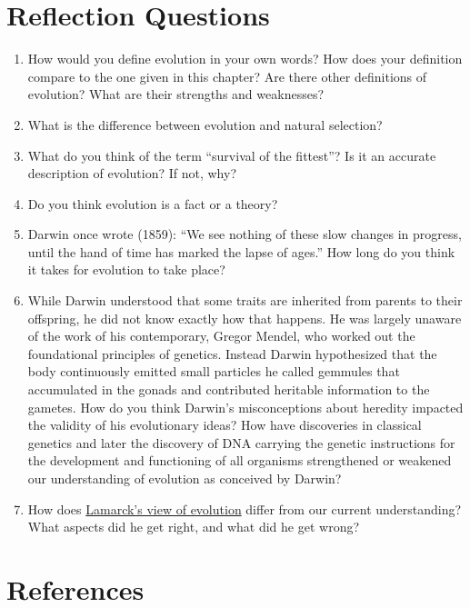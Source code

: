 \documentclass[
]{book}
\providecommand{\tightlist}{%
  \setlength{\itemsep}{0pt}\setlength{\parskip}{0pt}}
\begin{document}
\hypertarget{reflection-questions}{%
\section{Reflection Questions}\label{reflection-questions}}

\begin{enumerate}
\def\labelenumi{\arabic{enumi}.}
\tightlist
\item
  How would you define evolution in your own words? How does your definition compare to the one given in this chapter? Are there other definitions of evolution? What are their strengths and weaknesses?
\item
  What is the difference between evolution and natural selection?
\item
  What do you think of the term ``survival of the fittest''? Is it an accurate description of evolution? If not, why?
\item
  Do you think evolution is a fact or a theory?
\item
  Darwin once wrote (1859): ``We see nothing of these slow changes in progress, until the hand of time has marked the lapse of ages.'' How long do you think it takes for evolution to take place?
\item
  While Darwin understood that some traits are inherited from parents to their offspring, he did not know exactly how that happens. He was largely unaware of the work of his contemporary, Gregor Mendel, who worked out the foundational principles of genetics. Instead Darwin hypothesized that the body continuously emitted small particles he called gemmules that accumulated in the gonads and contributed heritable information to the gametes. How do you think Darwin's misconceptions about heredity impacted the validity of his evolutionary ideas? How have discoveries in classical genetics and later the discovery of DNA carrying the genetic instructions for the development and functioning of all organisms strengthened or weakened our understanding of evolution as conceived by Darwin?
\item
  How does \href{https://en.wikipedia.org/wiki/Lamarckism}{Lamarck's view of evolution} differ from our current understanding? What aspects did he get right, and what did he get wrong?
\end{enumerate}

\hypertarget{references-1}{%
\section{References}\label{references-1}}
\end{document}
